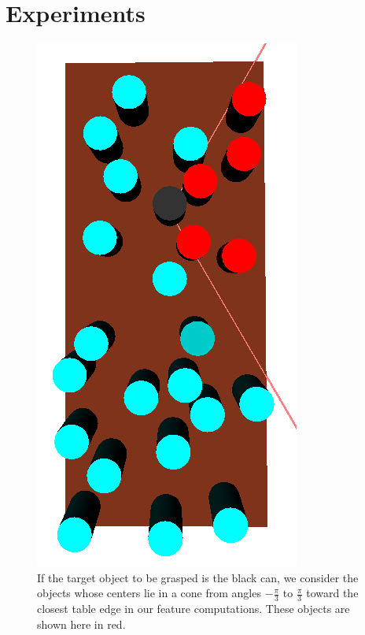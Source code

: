 \section{Experiments}
\begin{figure}[t]
  \centering
    \includegraphics[scale=0.3,angle=90]{images/feature_cone.png}
  \caption{\small{If the target object to be grasped is the black can, we consider the objects
whose centers lie in a cone from angles $-\frac{\pi}{3}$ to $\frac{\pi}{3}$ toward the closest table edge in
our feature computations. These objects are shown here in red.}}
  \label{fig:cone}
\end{figure}

